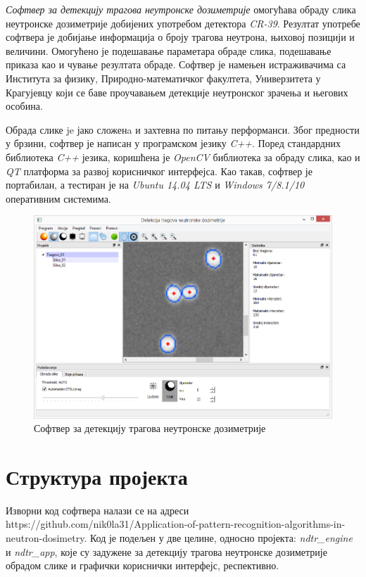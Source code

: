 \documentclass[12pt,a4paper,serbian,oneside]{book}
\begin{document}
\textit{Софтвер за детекцију трагова неутронске дозиметрије} омогућава обраду слика неутронске дозиметрије добијених употребом детектора \textit{CR-39}. Резултат употребе софтвера је добијање информација о броју трагова неутрона, њиховој позицији и величини. Омогућено је подешавање параметара обраде слика, подешавање приказа као и чување резултата обраде. Софтвер је намењен истраживачима са Института за физику, Природно-математичког факултета, Универзитета у Крагујевцу који се баве проучавањем детекције неутронског зрачења и његових особина.

Обрада слике je јако сложенa и захтевна по питању перформанси. Због предности у брзини, софтвер је написан у програмском језику \textit{C++}. Поред стандардних библиотека \textit{C++} језика, коришћена је \textit{OpenCV} библиотека за обраду слика, као и \textit{QT} платформа за развој корисничког интерфејса. Као такав, софтвер је портабилан, а тестиран је на \textit{Ubuntu 14.04 LTS} и \textit{Windows 7/8.1/10} оперативним системима.

\begin{figure}[H]
\begin{center}
\includegraphics[width=135mm]{images/softver.PNG}
\end{center}
\caption{Софтвер за детекцију трагова неутронске дозиметрије}
\label{fig:softver}
\end{figure}

\section{Структура пројекта}

Изворни код софтвера налази се на адреси https://github.com/nik0la31/Application-of-pattern-recognition-algorithms-in-neutron-dosimetry. Код је подељен у две целине, односно пројекта: \textit{ndtr\_engine} и \textit{ndtr\_app}, које су задужене за детекцију трагова неутронске дозиметрије обрадом слике и графички кориснички интерфејс, респективно.
\end{document}
